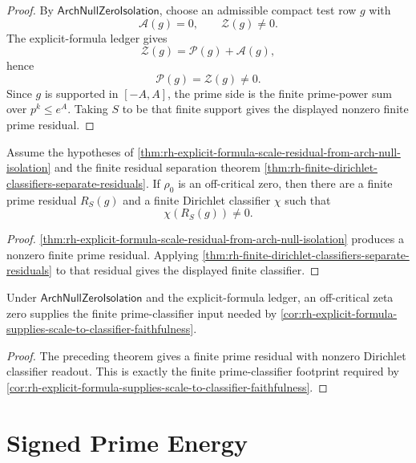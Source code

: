 \begin{proof}
By $\mathsf{ArchNullZeroIsolation}$, choose an admissible compact test
row $g$ with
$$
\mathcal A(g)=0,
\qquad
\mathcal Z(g)\ne0.
$$
The explicit-formula ledger gives
$$
\mathcal Z(g)=\mathcal P(g)+\mathcal A(g),
$$
hence
$$
\mathcal P(g)=\mathcal Z(g)\ne0.
$$
Since $g$ is supported in $[-A,A]$, the prime side is the finite
prime-power sum over $p^k\le e^A$.  Taking $S$ to be that finite support
gives the displayed nonzero finite prime residual.
\end{proof}

\begin{theorem}
\label{thm:rh-offline-zero-produces-finite-prime-classifier-defect}
Assume the hypotheses of
\autoref{thm:rh-explicit-formula-scale-residual-from-arch-null-isolation}
and the finite residual separation theorem
\autoref{thm:rh-finite-dirichlet-classifiers-separate-residuals}.  If
$\rho_0$ is an off-critical zero, then there are a finite prime residual
$R_S(g)$ and a finite Dirichlet classifier $\chi$ such that
$$
\chi(R_S(g))\ne0.
$$
\end{theorem}

\begin{proof}
\autoref{thm:rh-explicit-formula-scale-residual-from-arch-null-isolation}
produces a nonzero finite prime residual.  Applying
\autoref{thm:rh-finite-dirichlet-classifiers-separate-residuals} to that
residual gives the displayed finite classifier.
\end{proof}

\begin{corollary}
\label{cor:rh-explicit-formula-bridge-supplies-pfz-classifier-input}
Under $\mathsf{ArchNullZeroIsolation}$ and the explicit-formula ledger, an
off-critical zeta zero supplies the finite prime-classifier input needed
by \autoref{cor:rh-explicit-formula-supplies-scale-to-classifier-faithfulness}.
\end{corollary}

\begin{proof}
The preceding theorem gives a finite prime residual with nonzero
Dirichlet classifier readout.  This is exactly the finite
prime-classifier footprint required by
\autoref{cor:rh-explicit-formula-supplies-scale-to-classifier-faithfulness}.
\end{proof}

\section{Signed Prime Energy}
\label{sec:rh-explicit-formula-signed-prime-energy}

